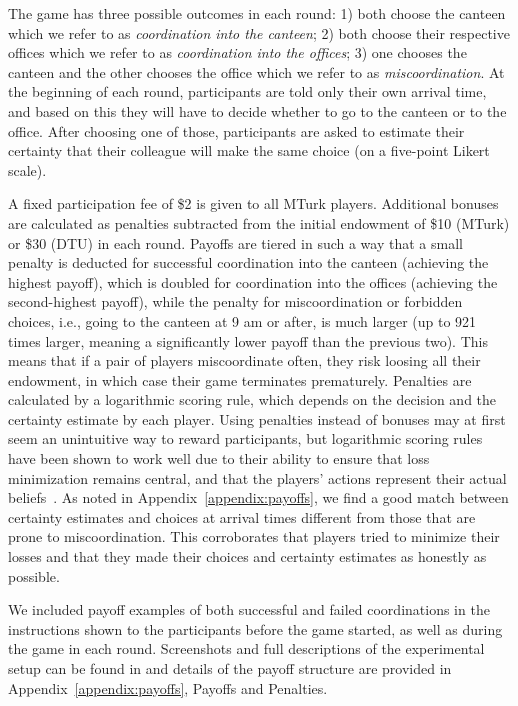 The game has three possible outcomes in each round: 1) both choose the canteen which we refer to as \emph{coordination into the canteen}; 2) both choose their respective offices which we refer to as \emph{coordination into the offices}; 3) one chooses the canteen and the other chooses the office which we refer to as \emph{miscoordination}. At the beginning of each round, participants are told only their own arrival time, and based on this they will have to decide whether to go to the canteen or to the office. After choosing one of those, participants are asked to estimate their certainty that their colleague will make the same choice (on a five-point Likert scale). 

A fixed participation fee of \$2 is given to all MTurk players. Additional bonuses are calculated as penalties subtracted from the initial endowment of \$10 (MTurk) or \$30 (DTU) in each round. Payoffs are tiered in such a way that a small penalty is deducted for successful coordination into the canteen (achieving the highest payoff), which is doubled for coordination into the offices (achieving the second-highest payoff), while the penalty for miscoordination or forbidden choices, i.e., going to the canteen at 9 am or after, is much larger (up to 921 times larger, meaning a significantly lower payoff than the previous two). This means that if a pair of players miscoordinate often, they risk loosing all their endowment, in which case their game terminates prematurely. Penalties are calculated by a logarithmic scoring rule, which depends on the decision and the certainty estimate by each player. Using penalties instead of bonuses may at first seem an unintuitive way to reward participants, but logarithmic scoring rules have been shown to work well due to their ability to ensure that loss minimization remains central, and that the players' actions represent their actual beliefs~\cite{good1992rational, seidenfeld1985calibration, palfrey2009eliciting, mccutcheon2019favor}. %
As noted in Appendix~\ref{appendix:payoffs}, we find a good match between certainty estimates and choices at arrival times different from those that are prone to miscoordination. This corroborates that players tried to minimize their losses and that they made their choices and certainty estimates as honestly as possible. 

We included payoff examples of both successful and failed coordinations in the instructions shown to the participants before the game started, as well as during the game in each round. Screenshots and full descriptions of the experimental setup can be found in  and details of the payoff structure are provided in Appendix~\ref{appendix:payoffs}, Payoffs and Penalties.

